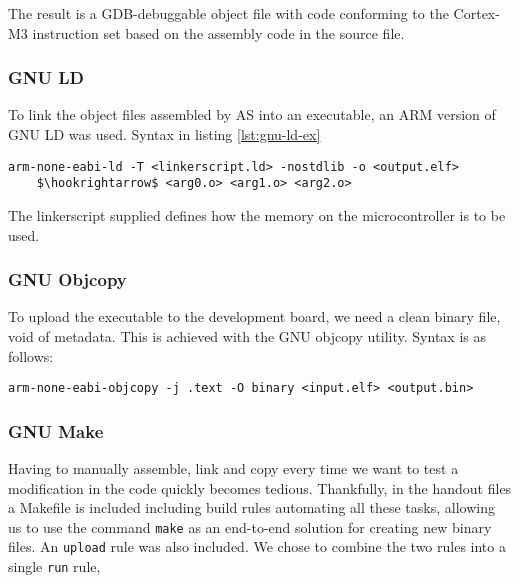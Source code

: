 The result is a GDB-debuggable object file with code conforming to the Cortex-M3 instruction set based on the assembly code in the source file.

\subsubsection{GNU LD}

To link the object files assembled by AS into an executable, an ARM version of GNU LD was used. Syntax in listing \ref{lst:gnu-ld-ex}

\begin{lstlisting}[label=lst:gnu-ld-ex,caption=Linker usage, mathescape]
arm-none-eabi-ld -T <linkerscript.ld> -nostdlib -o <output.elf>
    $\hookrightarrow$ <arg0.o> <arg1.o> <arg2.o>
\end{lstlisting}

The linkerscript supplied defines how the memory on the microcontroller is to be used.

\subsubsection{GNU Objcopy}

To upload the executable to the development board, we need a clean binary file, void of metadata. This is achieved with the GNU objcopy utility. Syntax is as follows:

\begin{lstlisting}[label=lst:gnu-objcopy-ex,caption=Objcopy usage]
arm-none-eabi-objcopy -j .text -O binary <input.elf> <output.bin>
\end{lstlisting}


\subsubsection{GNU Make}

Having to manually assemble, link and copy every time we want to test a modification in the code quickly becomes tedious. Thankfully, in the handout files a Makefile is included including build rules automating all these tasks, allowing us to use the command \texttt{make} as an end-to-end solution for creating new binary files. An \texttt{upload} rule was also included. We chose to combine the two rules into a single \texttt{run} rule, 
